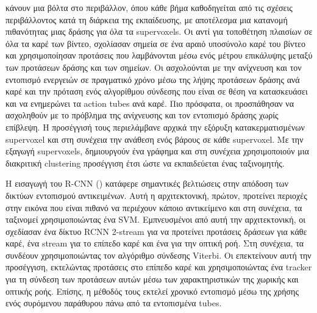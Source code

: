 κάνουν μια βόλτα στο περιβάλλον, όπου κάθε βήμα καθοδηγείται από τις σχέσεις περιβάλλοντος κατά τη διάρκεια της εκπαίδευσης, με αποτέλεσμα μια κατανομή  πιθανότητας μιας δράσης για όλα τα \en supervoxels\gr.
Οι \en\cite{DBLP:journals/corr/MettesGS16} \gr αντί για τοποθέτηση  πλαισίων σε όλα τα καρέ των βίντεο, σχολίασαν σημεία σε ένα αραιό  υποσύνολο καρέ του  βίντεο και χρησιμοποίησαν
προτάσεις που λαμβάνονται μέσω ενός μέτρου επικάλυψης μεταξύ των προτάσεων δράσης και των σημείων.
Οι \en\cite{DBLP:journals/corr/BehlSSSCT17} \gr ασχολούνται με  την ανίχνευση και τον εντοπισμό  ενεργειών σε πραγματικό χρόνο μέσω της λήψης προτάσεων δράσης ανά καρέ και την πρόταση ενός αλγορίθμου
σύνδεσης που είναι σε θέση να κατασκευάσει και να ενημερώνει τα \en action tubes \gr ανά καρέ. Πιο πρόσφατα, οι  \en\cite{8237344} \gr προσπάθησαν  να ασχοληθούν  με το πρόβλημα της ανίχνευσης και
τον εντοπισμό δράσης χωρίς επίβλεψη. Η προσέγγισή τους περιελάμβανε αρχικά την εξόρυξη  κατακερματισμένων \en supervoxel \gr
και στη συνέχεια την ανάθεση ενός βάρους σε κάθε \en supervoxel\gr. Με την εξαγωγή \en supervoxels\gr, δημιουργούν ένα γράφημα και
στη συνέχεια χρησιμοποιούν μια διακριτική \en clustering \gr προσέγγιση έτσι ώστε να εκπαιδεύεται ένας ταξινομητής.

Η εισαγωγή του \en R-CNN (\cite{DBLP:journals/corr/GirshickDDM13}) \gr κατάφερε σημαντικές βελτιώσεις
στην  απόδοση των δικτύων εντοπισμού αντικειμένων. Αυτή η αρχιτεκτονική,
πρώτον, προτείνει περιοχές στην εικόνα που είναι πιθανό να περιέχουν κάποιο αντικείμενο και
στη συνέχεια, τα ταξινομεί χρησιμοποιώντας ένα \en SVM\gr. Εμπνευσμένοι από αυτή την αρχιτεκτονική,
οι \en \cite{DBLP:journals/corr/GkioxariM14} \gr σχεδίασαν ένα δίκτυο \en RCNN 2-stream \gr για να προτείνει 
προτάσεις δράσεων  για κάθε καρέ, ένα \en stream \gr για το επίπεδο καρέ και ένα για την 
οπτική ροή. Στη συνέχεια, τα συνδέουν χρησιμοποιώντας τον αλγόριθμο σύνδεσης \en Viterbi\gr.
Οι \en \cite{DBLP:journals/corr/WeinzaepfelHS15} \gr επεκτείνουν αυτή την προσέγγιση, εκτελώντας
προτάσεις στο επίπεδο καρέ  και χρησιμοποιώντας ένα \en tracker \gr για τη σύνδεση των προτάσεων αυτών μέσω των
χαρακτηριστικών της χωρικής και οπτικής ροής. Επίσης, η μέθοδός τους εκτελεί χρονικό εντοπισμό μέσω της χρήσης
ενός συρόμενου παράθυρου πάνω από τα εντοπισμένα \en tubes\gr.   \par

